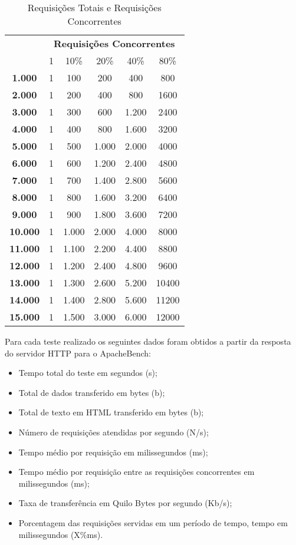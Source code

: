 \begin{table}[htb]
	\centering
\ABNTEXfontereduzida
\caption[Requisições Totais e Requisições Concorrentes]{Requisições Totais e Requisições Concorrentes}
\label{tab:requisicoes}
\begin{tabular}{|>{\bfseries}c|c|c|c|c|c|}
\hline
\multirow{2}{*}{Requisições Totais} & \multicolumn{5}{c|}{\textbf{Requisições Concorrentes}} \\ \cline{2-6}
& 1    & 10\%      & 20\%  & 40\%  & 80\%  \\ \hline
1.000  & 1 & 100   & 200   & 400   & 800   \\ \hline
2.000  & 1 & 200   & 400   & 800   & 1600  \\ \hline
3.000  & 1 & 300   & 600   & 1.200 & 2400  \\ \hline
4.000  & 1 & 400   & 800   & 1.600 & 3200  \\ \hline
5.000  & 1 & 500   & 1.000 & 2.000 & 4000  \\ \hline
6.000  & 1 & 600   & 1.200 & 2.400 & 4800  \\ \hline
7.000  & 1 & 700   & 1.400 & 2.800 & 5600  \\ \hline
8.000  & 1 & 800   & 1.600 & 3.200 & 6400  \\ \hline
9.000  & 1 & 900   & 1.800 & 3.600 & 7200  \\ \hline
10.000 & 1 & 1.000 & 2.000 & 4.000 & 8000  \\ \hline
11.000 & 1 & 1.100 & 2.200 & 4.400 & 8800  \\ \hline
12.000 & 1 & 1.200 & 2.400 & 4.800 & 9600  \\ \hline
13.000 & 1 & 1.300 & 2.600 & 5.200 & 10400 \\ \hline
14.000 & 1 & 1.400 & 2.800 & 5.600 & 11200 \\ \hline
15.000 & 1 & 1.500 & 3.000 & 6.000 & 12000 \\ \hline
\end{tabular}
\end{table}
Para cada teste realizado os seguintes dados foram obtidos a partir da resposta do servidor HTTP para o ApacheBench:
\begin{itemize}
	\item Tempo total do teste em segundos (s);
	\item Total de dados transferido em bytes (b);
	\item Total de texto em HTML transferido em bytes (b);
	\item Número de requisições atendidas por segundo (N/s);
	\item Tempo médio por requisição em milissegundos (ms);
	\item Tempo médio por requisição entre as requisições concorrentes em milissegundos (ms);
	\item Taxa de transferência em Quilo Bytes por segundo (Kb/s);
	\item Porcentagem das requisições servidas em um período de tempo, tempo em milissegundos (X\%ms).
\end{itemize}
